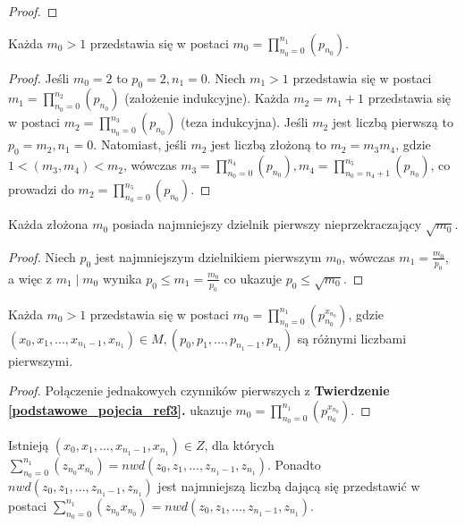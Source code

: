 \begin{appendices}
\begin{theorem}
\begin{proof}
\end{proof}
\end{theorem}
\begin{theorem}
Każda $m_0 > 1$ przedstawia się w postaci $m_0 = \prod_{n_0 = 0}^{n_1}(p_{n_0})$.
\begin{proof}
Jeśli $m_0 = 2$ to $p_0 = 2, n_1 = 0$. Niech $m_1 > 1$ przedstawia się w postaci $m_1 = \prod_{n_0 = 0}^{n_2}(p_{n_0})$ (założenie indukcyjne). Każda $m_2 = m_1 + 1$ przedstawia się w postaci $m_2 = \prod_{n_0 = 0}^{n_3}(p_{n_0})$ (teza indukcyjna). Jeśli $m_2$ jest liczbą pierwszą to $p_0 = m_2, n_1 = 0$. Natomiast, jeśli $m_2$ jest liczbą złożoną to $m_2 = m_3m_4$, gdzie $1 < (m_3, m_4) < m_2$, wówczas $m_3 = \prod_{n_0 = 0}^{n_4}(p_{n_0}), m_4 = \prod_{n_0 = n_4 + 1}^{n_5}(p_{n_0})$, co prowadzi do $m_2 = \prod_{n_0 = 0}^{n_5}(p_{n_0})$.
\end{proof}
\end{theorem}
\begin{theorem}
Każda złożona $m_0$ posiada najmniejszy dzielnik pierwszy nieprzekraczający $\sqrt{m_0}$.
\begin{proof}
Niech $p_0$ jest najmniejszym dzielnikiem pierwszym $m_0$, wówczas $m_1 = \frac{m_0}{p_0}$, a więc z $m_1 \mid m_0$ wynika $p_0 \leq m_1 = \frac{m_0}{p_0}$ co ukazuje $p_0 \leq \sqrt{m_0}$.
\end{proof}
\end{theorem}
\begin{theorem}
Każda $m_0 > 1$ przedstawia się w postaci $m_0 = \prod_{n_0 = 0}^{n_1}(p_{n_0}^{x_{n_0}})$, gdzie $(x_0, x_1, ..., x_{n_1 - 1}, x_{n_1}) \in M, (p_0, p_1, ..., p_{n_1 - 1}, p_{n_1})$ są różnymi liczbami pierwszymi.
\begin{proof}
Połączenie jednakowych czynników pierwszych z \textbf{Twierdzenie \ref{podstawowe_pojecia_ref3}.} ukazuje $m_0 = \prod_{n_0 = 0}^{n_1}(p_{n_0}^{x_{n_0}})$.
\end{proof}
\end{theorem}
\begin{theorem}
Istnieją $(x_0, x_1, ..., x_{n_1 - 1}, x_{n_1}) \in Z$, dla których $\sum_{n_0 = 0}^{n_1}(z_{n_0}x_{n_0}) = nwd(z_0, z_1, ..., z_{n_1 - 1}, z_{n_1})$. Ponadto $nwd(z_0, z_1, ..., z_{n_1 - 1}, z_{n_1})$ jest najmniejszą liczbą dającą się przedstawić w postaci $\sum_{n_0 = 0}^{n_1}(z_{n_0}x_{n_0}) = nwd(z_0, z_1, ..., z_{n_1 - 1}, z_{n_1})$.

\end{theorem}
\end{appendices}
